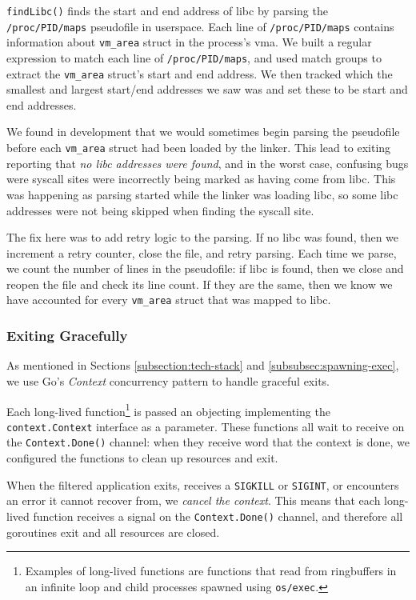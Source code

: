 \texttt{findLibc()} finds the start and end address of \ac{libc} by parsing the
\texttt{/proc/PID/maps} pseudofile in userspace. Each line of \texttt{/proc/PID/maps}
contains information about \texttt{vm\_area} struct in the process's \ac{vma}. We
built a regular expression to match each line of \texttt{/proc/PID/maps}, and
used match groups to extract the \texttt{vm\_area} struct's start and end address.
We then tracked which the smallest and largest start/end addresses we saw was
and set these to be  start and end addresses.

We found in development that we would sometimes begin parsing the pseudofile
before each \texttt{vm\_area} struct had been loaded by the linker. This lead to
\af exiting reporting that \textit{no \ac{libc} addresses were found}, and in
the worst case, confusing bugs were syscall sites were incorrectly being marked as 
having come from \ac{libc}. This was happening as parsing started while the
linker was loading \ac{libc}, so some \ac{libc} addresses were not being skipped
when finding the syscall site.

The fix here was to add retry logic to the parsing. If no \ac{libc} was found,
then we increment a retry counter, close the file, and retry parsing. Each time
we parse, we count the number of lines in the pseudofile: if \ac{libc} is found,
then we close and reopen the file and check its line count. If they are the
same, then we know we have accounted for every \texttt{vm\_area} struct that was
mapped to \ac{libc}.


\subsubsection{Exiting Gracefully}

As mentioned in Sections \ref{subsection:tech-stack} and 
\ref{subsubsec:spawning-exec}, we use Go's \textit{Context} concurrency pattern
to handle graceful exits. 

Each long-lived function\footnote{Examples of long-lived functions are functions
that read from ringbuffers in an infinite loop and child processes spawned using
\texttt{os/exec}.} is passed an objecting implementing the 
\texttt{context.Context} interface as a parameter. These functions all wait to
receive on the \texttt{Context.Done()} channel: when they receive word that the
context is done, we configured the functions to clean up resources and exit. 

When the filtered application exits, receives a \texttt{SIGKILL} or 
\texttt{SIGINT}, or \af encounters an error it cannot recover from, we 
\textit{cancel the context}. This means that each long-lived function receives 
a signal on the \texttt{Context.Done()} channel, and therefore all goroutines 
exit and all resources are closed.

